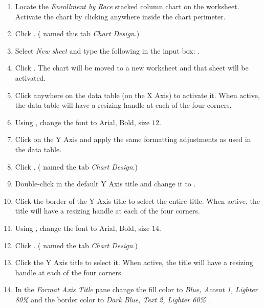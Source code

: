 \begin{enumerate}
	\item Locate the \textit{Enrollment by Race} stacked column chart on the  worksheet. Activate the chart by clicking anywhere inside the chart perimeter.
	\item Click . ( named this tab \textit{Chart Design}.) 
	\item Select \textit{New sheet} and type the following in the input box: . 
	\item Click . The chart will be moved to a new worksheet and that sheet will be activated.
	\item Click anywhere on the data table (on the X Axis) to activate it. When active, the data table will have a resizing handle at each of the four corners.
	\item Using , change the font to Arial, Bold, size $ 12 $.
	\item Click on the Y Axis and apply the same formatting adjustments as used in the data table. 
	\item Click . ( named the tab \textit{Chart Design}.)
	\item Double-click in the default Y Axis title and change it to .
	\item Click the border of the Y Axis title to select the entire title. When active, the title will have a resizing handle at each of the four corners.
	\item Using , change the font to Arial, Bold, size $ 14 $.
	\item Click . ( named the tab \textit{Chart Design}.)
	\item Click the Y Axis title to select it. When active, the title will have a resizing handle at each of the four corners.
	\item In the \textit{Format Axis Title} pane change the fill color to \textit{Blue, Accent 1, Lighter 80\%} and the border color to \textit{Dark Blue, Text 2, Lighter 60\%} .

\end{enumerate}
